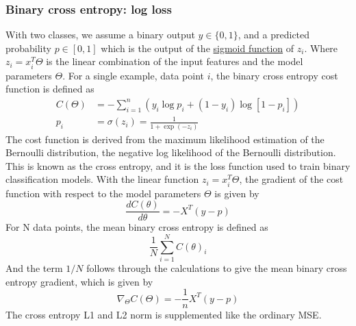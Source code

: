 \subsubsection{Binary cross entropy: log loss}
With two classes, we assume a binary output $y \in \{0, 1\}$, and a predicted probability $p \in [0, 1]$ which is
the output of the \hyperref[eq:Sigmoid]{sigmoid function} of $z_i$. 
Where $z_i = x_i^T\Theta$ is the linear combination of the input features and the model parameters $\Theta$. 
For a single example, data point $i$, the binary cross entropy cost function is defined as 
\begin{align}
    C(\Theta) &= -\sum_{i=1}^{n}(y_i \log p_i + 
    (1 - y_i)\log[1 - p_i]) \\
    p_i &= \sigma(z_i) = \frac{1}{1 + \exp(-z_i)}
    \label{eq:BinaryCost}
\end{align}
The cost function is derived from the maximum likelihood estimation of the Bernoulli distribution,
the negative log likelihood of the Bernoulli distribution. This is known as the cross entropy, and
it is the loss function used to train binary classification models. 
With the linear function $z_i = x_i^T\Theta$, the gradient of the cost function with respect 
to the model parameters $\Theta$ is given by
\begin{equation}
    \frac{dC(\theta)}{d\theta} = -X^T(y - p)
    \label{eq:BinaryCostGradient}
\end{equation}
For N data points, the mean binary cross entropy is defined as \[\frac{1}{N}\sum_{i=1}^{N}C(\theta)_i\]
And the term $1/N$ follows through the calculations to give the mean binary cross entropy gradient, which is given by
\begin{equation}
    \nabla_\Theta C(\Theta) = -\frac{1}{n}X^T(y - p)
    \label{eq:MeanBinaryCostGradient}
\end{equation}
The cross entropy L1 and L2 norm is supplemented like the ordinary MSE. 

